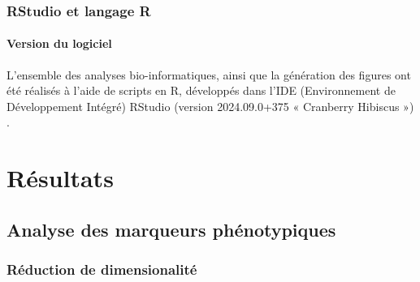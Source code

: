 \documentclass[11pt]{article}
\begin{document}
\subsubsection{RStudio et langage R}

\paragraph{Version du logiciel}

L’ensemble des analyses bio-informatiques, ainsi que la génération des figures ont été réalisés à l’aide de scripts en R, développés dans l’IDE (Environnement de Développement Intégré) RStudio (version 2024.09.0+375 « Cranberry Hibiscus ») \cite{RStudio2024}.



\newpage







\section{Résultats}

\subsection{Analyse des marqueurs phénotypiques}

\subsubsection{Réduction de dimensionalité}
\end{document}
